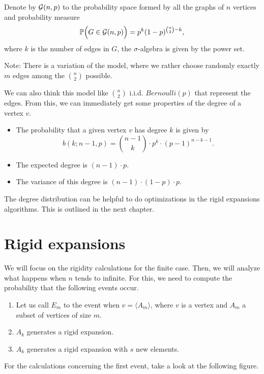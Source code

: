 \begin{defini}
Denote by $\mathcal{G}(n,p)$ to the probability space formed by all the graphs of $n$ vertices and probability measure 
$$ \mathbb{P}\Big(G\in \mathcal{G}(n,p)\Big) = p^{k} (1-p)^{\binom{n}{2}-k},$$
where $k$ is the number of edges in $G$, the $\sigma$-algebra is given by the power set.
\end{defini}

Note: There is a variation of the model, where we rather choose randomly exactly $m$ edges among the $\binom{n}{2}$ possible.

We can also think this model like $\binom{n}{2}$ i.i.d. $Bernoulli(p)$ that represent the edges. From this, we can immediately get some properties of the degree of a vertex $v$.

\begin{itemize}
\item The probability that a given vertex $v$ has degree $k$ is given by
$$b(k; n-1,p) = \binom{n-1}{k} \cdot p^{k} \cdot (p-1)^{n-k-1}.$$
\item The expected degree is $(n-1)\cdot p$.
\item The variance of this degree is $(n-1)\cdot (1-p) \cdot p$.
\end{itemize}

The degree distribution can be helpful to do optimizations in the rigid expansions algorithms. This is outlined in the next chapter.

\section{Rigid expansions}

 We will focus on the rigidity calculations for the finite case. Then, we will analyze what happens when $n$ tends to infinite. For this, we need to compute the probability that the following events occur.

\begin{enumerate}
\item Let us call $E_{m}$ to the event when $v=\langle A_{m}\rangle$, where $v$ is a vertex and $A_{m}$ a subset of vertices of size $m$.
\item $A_k$ generates a rigid expansion.
\item $A_k$ generates a rigid expansion with $s$ new elements.
\end{enumerate}

For the calculations concerning the first event, take a look at the following figure.

